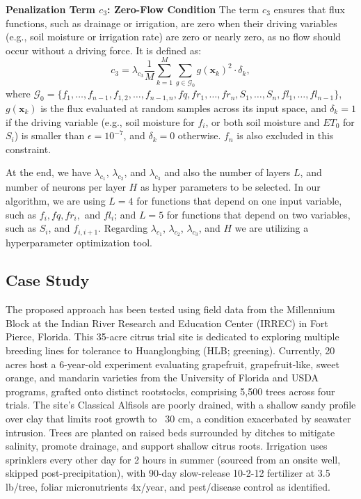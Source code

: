 \documentclass[pdflatex,sn-nature]{sn-jnl}%
\theoremstyle{thmstyleone}%
\theoremstyle{thmstyletwo}%
\theoremstyle{thmstylethree}%
\begin{document}
\textbf{Penalization Term \( c_3 \): Zero-Flow Condition}
The term \( c_3 \) ensures that flux functions, such as drainage or irrigation, are zero when their driving variables (e.g., soil moisture or irrigation rate) are zero or nearly zero, as no flow should occur without a driving force. It is defined as:
\[
c_3 = \lambda_{c_3} \frac{1}{M} \sum_{k=1}^M \sum_{g \in \mathcal{G}_0} g(\mathbf{x}_k)^2 \cdot \delta_k,
\]
where \( \mathcal{G}_0 = \{ f_1, \dots, f_{n-1}, f_{1,2}, \dots, f_{n-1,n}, fq, fr_1, \dots, fr_n, S_1, \dots, S_n, fl_1, \dots, fl_{n-1} \} \), \( g(\mathbf{x}_k) \) is the flux evaluated at random samples across its input space, and \( \delta_k = 1 \) if the driving variable (e.g., soil moisture for \( f_i \), or both soil moisture and \( ET_0 \) for \( S_i \)) is smaller than \( \epsilon = 10^{-7} \), and \( \delta_k = 0 \) otherwise. \( f_n \) is also excluded in this constraint.

At the end, we have $\lambda_{c_1}$, $\lambda_{c_2}$, and $\lambda_{c_3}$ and also the number of layers $L$, and number of neurons per layer $H$ as hyper parameters to be selected. In our algorithm, we are using $L=4$ for functions that depend on one input variable, such as $f_i, fq, fr_i,$ and $fl_i$; and $L=5$ for functions that depend on two variables, such as $S_i$, and $f_{i, i+1}$. Regarding $\lambda_{c_1}$, $\lambda_{c_2}$, $\lambda_{c_3}$, and $H$ we are utilizing a hyperparameter optimization tool. 


\subsection{Case Study} \label{Test Case}
The proposed approach has been tested using field data from the Millennium Block at the Indian River Research and Education Center (IRREC) in Fort Pierce, Florida. This 35-acre citrus trial site is dedicated to exploring multiple breeding lines for tolerance to Huanglongbing (HLB; greening). Currently, 20 acres host a 6-year-old experiment evaluating grapefruit, grapefruit-like, sweet orange, and mandarin varieties from the University of Florida and USDA programs, grafted onto distinct rootstocks, comprising 5,500 trees across four trials. The site's Classical Alfisols are poorly drained, with a shallow sandy profile over clay that limits root growth to ~30 cm, a condition exacerbated by seawater intrusion. Trees are planted on raised beds surrounded by ditches to mitigate salinity, promote drainage, and support shallow citrus roots. Irrigation uses sprinklers every other day for 2 hours in summer (sourced from an onsite well, skipped post-precipitation), with 90-day slow-release 10-2-12 fertilizer at 3.5 lb/tree, foliar micronutrients 4x/year, and pest/disease control as identified.
\end{document}

